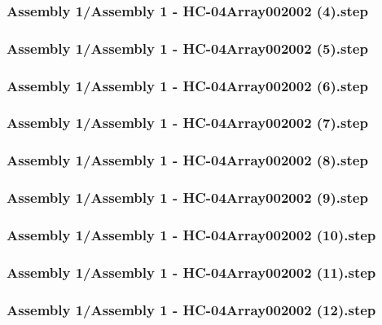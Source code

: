 \documentclass[a4paper,12pt]{article}
\begin{document}
\subsubsection{Assembly 1/Assembly 1 - HC-04Array002002 (4).step}

\subsubsection{Assembly 1/Assembly 1 - HC-04Array002002 (5).step}

\subsubsection{Assembly 1/Assembly 1 - HC-04Array002002 (6).step}

\subsubsection{Assembly 1/Assembly 1 - HC-04Array002002 (7).step}

\subsubsection{Assembly 1/Assembly 1 - HC-04Array002002 (8).step}

\subsubsection{Assembly 1/Assembly 1 - HC-04Array002002 (9).step}

\subsubsection{Assembly 1/Assembly 1 - HC-04Array002002 (10).step}

\subsubsection{Assembly 1/Assembly 1 - HC-04Array002002 (11).step}

\subsubsection{Assembly 1/Assembly 1 - HC-04Array002002 (12).step}

\end{document}
